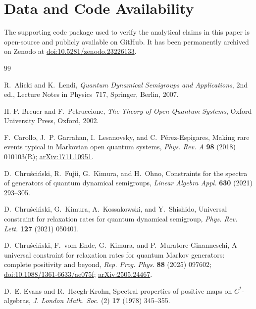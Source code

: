 \documentclass[11pt,a4paper]{article}
\theoremstyle{plain}
\theoremstyle{definition}
\theoremstyle{remark}
\numberwithin{equation}{section}
\begin{document}
\section*{Data and Code Availability}
The supporting code package used to verify the analytical claims in this paper is open-source and publicly available on GitHub. It has been permanently archived on Zenodo at \href{https://doi.org/10.5281/zenodo.23226133}{doi:10.5281/zenodo.23226133}.








\begin{thebibliography}{99}

R.~Alicki and K.~Lendi,
\emph{Quantum Dynamical Semigroups and Applications}, 2nd ed.,
Lecture Notes in Physics~717, Springer, Berlin, 2007.

H.-P. Breuer and F.~Petruccione,
\emph{The Theory of Open Quantum Systems},
Oxford University Press, Oxford, 2002.

F.~Carollo, J.~P. Garrahan, I.~Lesanovsky, and C.~P\'erez-Espigares,
Making rare events typical in Markovian open quantum systems,
\emph{Phys. Rev. A} \textbf{98} (2018) 010103(R);
\href{https://arxiv.org/abs/1711.10951}{arXiv:1711.10951}.

D.~Chru\'sci\'nski, R.~Fujii, G.~Kimura, and H.~Ohno,
Constraints for the spectra of generators of quantum dynamical semigroups,
\emph{Linear Algebra Appl.} \textbf{630} (2021) 293--305.

D.~Chru\'sci\'nski, G.~Kimura, A.~Kossakowski, and Y.~Shishido,
Universal constraint for relaxation rates for quantum dynamical semigroup,
\emph{Phys. Rev. Lett.} \textbf{127} (2021) 050401.

D.~Chru\'sci\'nski, F.~vom Ende, G.~Kimura, and P.~Muratore-Ginanneschi,
A universal constraint for relaxation rates for quantum Markov generators:
complete positivity and beyond,
\emph{Rep. Prog. Phys.} \textbf{88} (2025) 097602;
\href{https://doi.org/10.1088/1361-6633/ae075f}{doi:10.1088/1361-6633/ae075f};
\href{https://arxiv.org/abs/2505.24467}{arXiv:2505.24467}.

D.~E. Evans and R.~H{\o}egh-Krohn,
Spectral properties of positive maps on $C^*$-algebras,
\emph{J. London Math. Soc.} (2) \textbf{17} (1978) 345--355.


\end{thebibliography}
\end{document}
